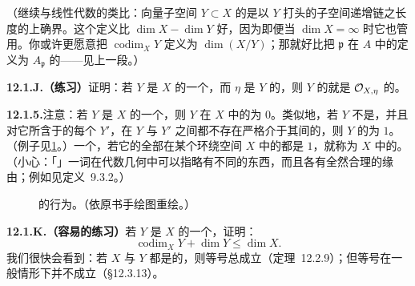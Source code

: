 （继续与线性代数的类比：向量子空间 $Y\subset X$ 的\trCodimension{}是以 $Y$ 打头的子空间递增链之长度的上确界。这个定义比 $\dim X-\dim Y$ 好，因为即便当 $\dim X=\infty$ 时它也管用。你或许更愿意把 $\operatorname{codim}_X Y$ 定义为 $\dim(X/Y)$；那就好比把 $\mathfrak{p}$ 在 $A$ 中的\trCodimension{}定义为 $A_{\mathfrak{p}}$ 的\trDimension{}——见上一段。）

\textbf{12.1.J.（练习）}\quad 证明：若 $Y$ 是\trScheme{} $X$ 的一个\trIrreducible{}\trClosedSubset，而 $\eta$ 是 $Y$ 的\trGenericPoint，则 $Y$ 的\trCodimension{}就是\trLocalRing{} $\mathcal{O}_{X,\eta}$ 的\trDimension。

\textbf{12.1.5.}\quad 注意：若 $Y$ 是 $X$ 的一个\trIrreducibleComponent，则 $Y$ 在 $X$ 中的\trCodimension{}为 $0$。类似地，若 $Y$ 不是\trIrreducibleComponent，并且对它所含于的每个\trIrreducibleComponent{} $Y'$，在 $Y$ 与 $Y'$ 之间都不存在严格介于其间的\trIrreducible{}\trClosedSubset，则 $Y$ 的\trCodimension{}为 $1$。（例子见\cref{fig:codim-behavior}。）一个\trClosedSubset，若它的全部\trIrreducibleComponent{}在某个环绕空间 $X$ 中的\trCodimension{}都是 $1$，就称为 $X$ 中的\textbf{\trHypersurface}。（小心：「\trHypersurface」一词在代数几何中可以指略有不同的东西，而且各有全然合理的缘由；例如见定义~9.3.2。）

\begin{figure}[htbp]
\centering
{}
\caption{\trCodimension{}的行为。（依原书手绘图重绘。）}\label{fig:codim-behavior}
\end{figure}

\textbf{12.1.K.（容易的练习）}\quad 若 $Y$ 是\trScheme{} $X$ 的一个\trIrreducible{}\trClosedSubset，证明：
\begin{equation*}\tag{12.1.5.1}\label{eq:codim-dim-inequality}
\operatorname{codim}_X Y+\dim Y\le\dim X.
\end{equation*}
我们很快会看到：若 $X$ 与 $Y$ 都是\trIrreducible{}的\trVariety，则等号总成立（定理~12.2.9）；但等号在一般情形下并不成立（\S12.3.13）。

